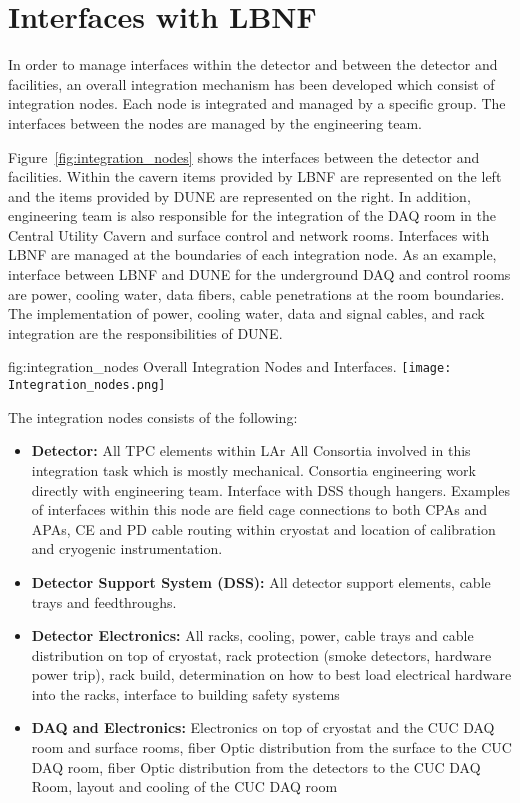 \chapter{Interfaces with LBNF}
\label{vl:tc-lbnf}


In order to manage interfaces within the detector and between the
detector and facilities, an overall integration mechanism has been
developed which consist of integration nodes. Each node is integrated
and managed by a specific group. The interfaces between the nodes are
managed by the  engineering team.


Figure~\ref{fig:integration_nodes} shows the interfaces between the
detector and facilities. Within the cavern items provided by LBNF are
represented on the left and the items provided by DUNE are represented
on the right. In addition,  engineering team is also
responsible for the integration of the DAQ room in the Central Utility
Cavern and surface control and network rooms. Interfaces with LBNF are
managed at the boundaries of each integration node. As an example,
interface between LBNF and DUNE for the underground DAQ and control
rooms are power, cooling water, data fibers, cable penetrations at the
room boundaries. The implementation of power, cooling water, data and
signal cables, and rack integration are the responsibilities of DUNE.
\begin{dunefigure}{fig:integration_nodes}
  {Overall Integration Nodes and Interfaces.}
  \texttt{[image: Integration\_nodes.png]}
\end{dunefigure}


The integration nodes consists of the following:
\begin{itemize}
\item {\bf Detector:} All TPC elements within LAr All Consortia involved in
  this integration task which is mostly mechanical. Consortia
  engineering work directly with  engineering team.
  Interface with DSS though hangers. Examples of interfaces within
  this node are field cage connections to both CPAs and APAs, CE and
  PD cable routing within cryostat and location of calibration and
  cryogenic instrumentation.
\item {\bf Detector Support System (DSS):} All detector support elements,
  cable trays and feedthroughs.
\item {\bf Detector Electronics:} All racks, cooling, power, cable
  trays and cable distribution on top of cryostat, rack protection
  (smoke detectors, hardware power trip), rack build, determination on
  how to best load electrical hardware into the racks, interface to
  building safety systems
\item {\bf DAQ and Electronics:} Electronics on top of cryostat and
  the CUC DAQ room and surface rooms, fiber Optic distribution from
  the surface to the CUC DAQ room, fiber Optic distribution from the
  detectors to the CUC DAQ Room, layout and cooling of the CUC DAQ
  room
\end{itemize}

